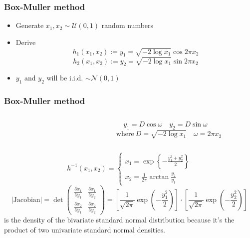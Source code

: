 \documentclass[10pt, compress]{beamer}
\begin{document}
\begin{frame}[fragile]
  \frametitle{Box-Muller method}
  \begin{itemize}
  	\item Generate $x_1, x_2 \sim \mathcal{U}(0,1)$ random numbers
  	\item Derive
  	  \[ h_1(x_1, x_2) := y_1 = \sqrt{-2 \log x_1} \cos{2\pi x_2} \]
  	  \[ h_2(x_1, x_2) := y_2 = \sqrt{-2 \log x_1} \sin{2\pi x_2} \] 
	\item $y_1$ and $y_2$ will be i.i.d. $\sim \mathcal{N}(0,1)$
  \end{itemize}
\end{frame}

\begin{frame}[fragile]
  \frametitle{Box-Muller method}
  \begin{columns}[t]
    \begin{column}{4cm}
    \end{column}
    \begin{column}{4cm}
      \[ y_1 = D \cos \omega \quad y_2 = D \sin \omega \quad \]
      \[ \text{where}\ D = \sqrt{-2 \log x_1} \quad \omega = 2\pi x_2 \]
    \end{column}
  \end{columns}

  \bigskip
  
  \bigskip
  
  \[
    h^{-1}(x_1,x_2) = \begin{cases}
      x_1 = \exp{\left\{ -\frac{y_1^2 + y_2^2}{2} \right\}}       
      \\
      x_2 = \frac{1}{2\pi} \arctan \frac{y_2}{y_1}
    \end{cases}
  \]
  \[
  	|\text{Jacobian}| = \det \left(
  	  \begin{matrix}
  	    \frac{\partial x_1}{\partial y_1} & \frac{\partial x_1}{\partial y_2} \\
  	    \frac{\partial x_2}{\partial y_1} & \frac{\partial x_2}{\partial y_2} 
  	  \end{matrix}
  	\right) = 
  	\left[ 
  	  \frac{1}{\sqrt{2\pi}} \exp{\left(-\frac{y_1^2}{2}\right)}
  	\right]
  	\cdot
  	\left[
  	  \frac{1}{\sqrt{2\pi}} \exp{\left(-\frac{y_2^2}{2}\right)} 
  	\right]
  \]
  is the density of the bivariate standard normal distribution because it's the product of two univariate standard normal densities.
\end{frame}
\end{document}
